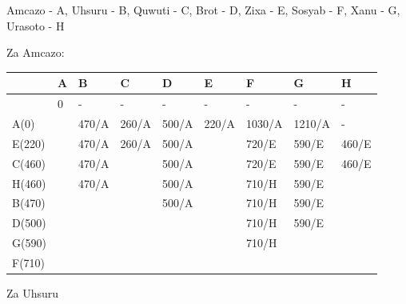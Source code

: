 \documentclass[12pt]{article}
\begin{document}
Amcazo - A, Uhsuru - B, Quwuti - C, Brot - D, Zixa - E, Sosyab - F, Xanu - G, Urasoto - H

Za Amcazo:

\begin{table}[hp]
\centering
\begin{tabular}{|l|l|l|l|l|l|l|l|l|}
\hline
             & A & B     & C     & D       & E       & F      & G        & H  \\ \hline
             & 0      & -          & -          & -          & -          & -           & -           & -        \\ \hline
A(0)    &        & 470/A & 260/A & 500/A & 220/A & 1030/A & 1210/A & -        \\ \hline
E(220)    &        & 470/A & 260/A & 500/A &            & 720/E    & 590/E    & 460/E \\ \hline
C(460)  &        & 470/A &            & 500/A &            & 720/E    & 590/E    & 460/E \\ \hline
H(460) &        & 470/A &            & 500/A &            & 710/H & 590/E    &          \\ \hline
B(470)  &        &            &            & 500/A &            & 710/H & 590/E    &          \\ \hline
D(500)    &        &            &            &            &            & 710/H & 590/E    &          \\ \hline
G(590)    &        &            &            &            &            & 710/H &             &          \\ \hline
F(710)  &        &            &            &            &            &             &             &          \\ \hline
\end{tabular}
\end{table}

Za Uhsuru
\end{document}
